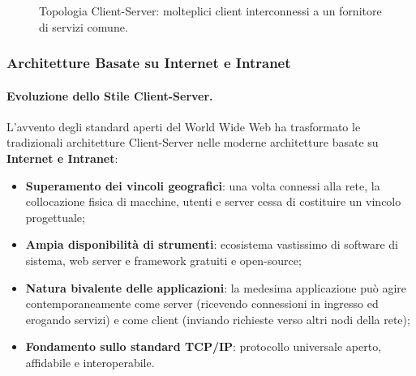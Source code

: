 \documentclass[12pt]{extarticle}
\begin{document}
\begin{figure}[htbp]
\centering
{}
\caption{Topologia Client-Server: molteplici client interconnessi a un fornitore di servizi comune.}
\label{fig:client_server_topology}
\end{figure}

\subsubsection{Architetture Basate su Internet e Intranet}

\paragraph{Evoluzione dello Stile Client-Server.}
L'avvento degli standard aperti del World Wide Web ha trasformato le tradizionali architetture Client-Server nelle moderne architetture basate su \textbf{Internet e Intranet}:
\begin{itemize}
    \item \textbf{Superamento dei vincoli geografici}: una volta connessi alla rete, la collocazione fisica di macchine, utenti e server cessa di costituire un vincolo progettuale;
    \item \textbf{Ampia disponibilità di strumenti}: ecosistema vastissimo di software di sistema, web server e framework gratuiti e open-source;
    \item \textbf{Natura bivalente delle applicazioni}: la medesima applicazione può agire contemporaneamente come server (ricevendo connessioni in ingresso ed erogando servizi) e come client (inviando richieste verso altri nodi della rete);
    \item \textbf{Fondamento sullo standard TCP/IP}: protocollo universale aperto, affidabile e interoperabile.
\end{itemize}
\end{document}
